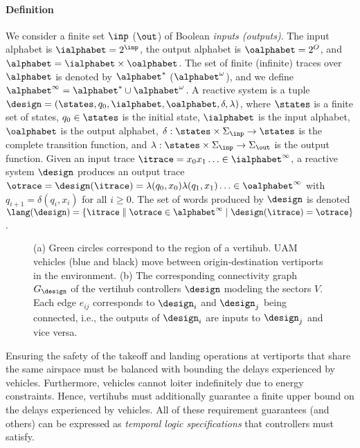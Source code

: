 \paragraph*{\textbf{Definition}}
We consider a finite set $\inp$ ($\out$) of Boolean \emph{inputs (outputs)}.
The input alphabet is
$\ialphabet=2^\inp$, the output alphabet is $\oalphabet=2^O$, and
$\alphabet=\ialphabet \times \oalphabet$. The set of finite (infinite) traces
over $\alphabet$ is denoted by $\alphabet^*$ ($\alphabet^\omega$), and
we define $\alphabet^{\infty} = \alphabet^* \cup \alphabet^\omega$.  A reactive system is a
tuple $\design = (\states,q_{0},\ialphabet,\oalphabet,\delta,\lambda)$,
where
$\states$ is a finite set of states,
$q_{0} \in \states$ is the initial state,
$\ialphabet$ is the input alphabet,
$\oalphabet$ is the output alphabet,
$\delta: \states \times \Sigma_{\inp} \to \states$ is the complete transition function, and $\lambda : \states \times \Sigma_{\inp} \to \Sigma_{\out}$ is the output function.
%
Given an input trace $\itrace = x_0 x_1 \ldots \in \ialphabet^\infty$, a reactive system $\mathcal{\design}$ produces an
output trace $\otrace = \mathcal{\design}(\itrace) = \lambda(q_0, x_0)
\lambda(q_1, x_1) \ldots \in \oalphabet^\infty$ with $q_{i+1} = \delta(q_i, x_i)$ for all $i \ge 0$.
The set of words produced by
$\mathcal{\design}$ is denoted $\lang(\mathcal{\design}) = \{\itrace \parallel \otrace \in
\alphabet^\infty \mid \mathcal{\design}(\itrace) = \otrace\}$.



\begin{figure}[h!]
	\centering

\caption{
(a) Green circles correspond to the region of a vertihub. UAM vehicles (blue and black) move between origin-destination vertiports in the environment.
(b)
The corresponding connectivity graph $G_\design$ of the vertihub controllers $\design$ modeling the sectors $V$. 
Each edge $e_{ij}$ corresponds to $\design_i$ and  $\design_j$ being connected, i.e., the outputs of $\design_i$ are inputs to $\design_j$ and vice versa.
}
    \end{figure}

Ensuring the safety of the takeoff and landing operations at vertiports that share the same airspace must be balanced with bounding the delays experienced by vehicles. Furthermore, vehicles cannot loiter indefinitely due to energy constraints.
Hence, vertihubs must additionally guarantee a finite upper bound on the delays experienced by vehicles.
All of these requirement guarantees (and others) can be expressed as \emph{temporal logic specifications} that controllers must satisfy. %


